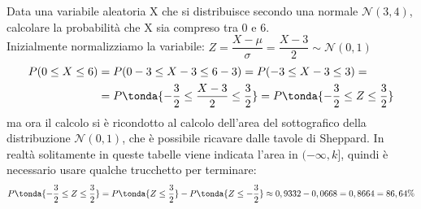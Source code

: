 \begin{esempio} Data una variabile aleatoria X che si distribuisce secondo una normale $\mathcal{N}(3,4)$, calcolare la probabilità che X sia compreso tra 0 e 6.\\[6pt]
Inizialmente normalizziamo la variabile: \(Z =\dfrac{X-\mu}{\sigma} = \dfrac{X-3}{2} \sim \mathcal{N}(0,1)\)
\[\begin{split}P(0\leq X \leq 6) &= P(0-3 \leq X-3 \leq 6-3) = P(-3 \leq X-3 \leq 3)=\\& = P\tonda{-\dfrac{3}{2}\leq \dfrac{X-3}{2} \leq \dfrac{3}{2}} = P\tonda{-\dfrac{3}{2}\leq Z \leq \dfrac{3}{2}} \end{split} \]
ma ora il calcolo si è ricondotto al calcolo dell'area del sottografico della distribuzione $\mathcal{N}(0,1)$, che è possibile ricavare dalle tavole di Sheppard. In realtà solitamente in queste tabelle viene indicata l'area in $(-\infty,k]$, quindi è necessario usare qualche trucchetto per terminare:
\[P\tonda{-\dfrac{3}{2}\leq Z \leq \dfrac{3}{2}} = P\tonda{Z \leq \dfrac{3}{2}}-P\tonda{Z \leq -\dfrac{3}{2}} \approx 0,9332-0,0668=0,8664 = 86,64 \%\]
\end{esempio}
